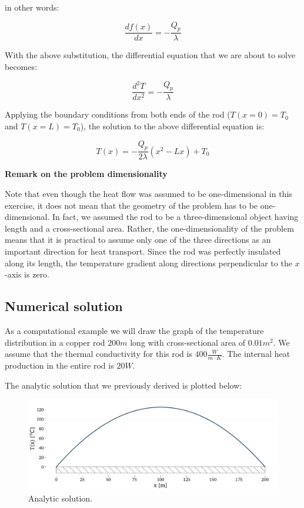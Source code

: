 in other words:

\begin{equation}
\frac{df(x)}{dx} = - \frac{Q_p}{\lambda}
\end{equation}

With the above substitution, the differential equation that we are about to solve becomes:

\begin{equation}
\frac{d^2T}{dx^2} = - \frac{Q_p}{\lambda}
\end{equation}

Applying the boundary conditions from both ends of the rod ($T(x=0) = T_0$ and $T(x=L) = T_0$), the solution to the above differential equation is:

\begin{equation}
T(x) = - \frac{Q_p}{2 \lambda} (x^2 - Lx) + T_0
\label{eq:solution}
\end{equation}

\textbf{Remark on the problem dimensionality}

Note that even though the heat flow was assumed to be one-dimensional in this exercise, it does not mean that the geometry of the problem has to be one-dimensional. In fact, we assumed the rod to be a three-dimensional object having length and a cross-sectional area. Rather, the one-dimensionality of the problem means that it is practical to assume only one of the three directions as an important direction for heat transport. Since the rod was perfectly insulated along its length, the temperature gradient along directions perpendicular to the $x$-axis is zero.

\subsection{Numerical solution}

As a computational example we will draw the graph of the temperature distribution in a copper rod $200m$ long with cross-sectional area of $0.01m^2$. We assume that the thermal conductivity for this rod is $400 \frac{W}{m \cdot K}$. The internal heat production in the entire rod is $20 W$.

The analytic solution that we previously derived is plotted below:

\begin{figure}[H]
\centering\includegraphics[width=12cm]{figures/example-heat-transfer-in-a-rod-analytic.pdf}
\caption{Analytic solution.}
\label{fig:analytic-solution}
\end{figure}

